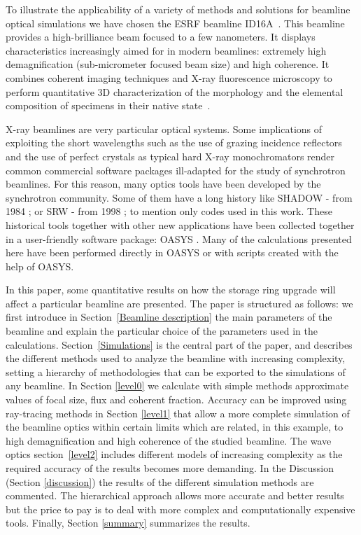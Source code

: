 \documentclass{iucr}              %
\begin{document}
To illustrate the applicability of a variety of methods and solutions for beamline optical simulations we have chosen the ESRF beamline ID16A~\cite{ID16A}. This beamline provides a high-brilliance beam focused to a few nanometers. It displays characteristics increasingly aimed for in modern beamlines: extremely high demagnification (sub-micrometer focused beam size) and high coherence. It combines coherent imaging techniques and X-ray fluorescence microscopy to perform quantitative 3D characterization of the morphology and the elemental composition of specimens in their native state~\cite{XRFID16A}.

X-ray beamlines are very particular optical systems. Some implications of exploiting the short wavelengths such as the use of grazing incidence reflectors and the use of perfect crystals as typical hard X-ray monochromators render common commercial software packages ill-adapted for the study of synchrotron beamlines. For this reason, many optics tools have been developed by the synchrotron community. Some of them have a long history like SHADOW - from 1984 \cite{firstShadow}; or SRW - from 1998 \cite{codeSRW}; to mention only codes used in this work. These historical tools together with other new applications have been collected together in a user-friendly software package: OASYS \cite{codeOASYS}. Many of the calculations presented here have been performed directly in OASYS or with scripts created with the help of OASYS. 

 In this paper, some quantitative results on how the storage ring upgrade will affect a particular beamline are presented. The paper is structured as follows: we first introduce in Section~\ref{Beamline description} the main parameters of the beamline and explain the particular choice of the parameters used in the calculations. Section~\ref{Simulations} is the central part of the paper, and describes the different methods used to analyze the beamline with increasing complexity, setting a hierarchy of methodologies that can be exported to the simulations of any beamline. In Section \ref{level0} we calculate with simple methods approximate values of focal size, flux and coherent fraction. Accuracy can be improved using ray-tracing methods in Section \ref{level1} that allow a more complete simulation of the beamline optics within certain limits which are related, in this example, to high demagnification and high coherence of the studied beamline. The wave optics section~\ref{level2} includes different models of increasing complexity as the required accuracy of the results becomes more demanding. In the Discussion (Section \ref{discussion}) the results of the different simulation methods are commented. The hierarchical approach allows more accurate and better results but the price to pay is to deal with more complex and computationally expensive tools. Finally, Section \ref{summary} summarizes the results.
\end{document}
